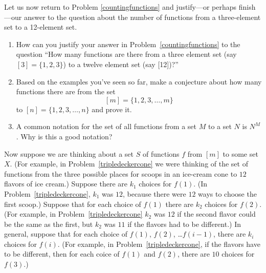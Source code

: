 \items  Let us now return to Problem \ref{countingfunctions} and
justify---or perhaps finish---our answer to the question about the
number of functions from a three-element set to a 12-element
set.\label{countingfunctions2}
\begin{enumerate}
\item How can you justify your answer in
  Problem~\ref{countingfunctions} to the question ``How many functions
  are there from a three element set (say $[3]=\{1,2,3\}$) to a twelve
  element set (say [12])?''  
\item Based on the examples you've seen so far, make a conjecture
  about how many functions there are from the set
  \[[m] = \{1,2,3,\dots,m\}\]
  to $[n]=\{1,2,3,\dots,n\}$ and prove it.
\label{numberoffunctionsconjecture}
\item A common notation for the set of all functions from a set $M$ to a
set $N$ is $N^M$.  Why is this a good notation? 
\end{enumerate}

\items Now suppose we are thinking about a set $S$ of functions $f$
from $[m]$ to some set $X$.  (For example, in
Problem~\ref{tripledeckercone} we were thinking of the set of
functions from the three possible places for scoops in an ice-cream
cone to $12$ flavors of ice cream.) Suppose there are $k_1$ choices
for $f(1)$.  (In Problem~\ref{tripledeckercone}, $k_1$ was $12$,
because there were $12$ ways to choose the first scoop.) Suppose that
for each choice of $f(1)$ there are $k_2$ choices for $f(2)$.  (For
example, in Problem~\ref{tripledeckercone} $k_2$ was $12$ if the
second flavor could be the same as the first, but $k_2$ was $11$ if
the flavors had to be different.) In general, suppose that for each
choice of $f(1)$, $f(2)$, \ldots $f(i-1)$, there are $k_i$ choices for
$f(i)$. (For example, in Problem~\ref{tripledeckercone}, if the
flavors have to be different, then for each coice of $f(1)$ and
$f(2)$, there are $10$ choices for $f(3)$.)

